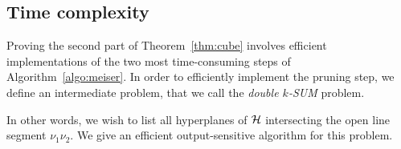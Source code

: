 \subsection{Time complexity}
\label{paper:ksum-algorithm:contrib:time-complexity}

Proving the second part of Theorem~\ref{thm:cube} involves efficient implementations of
the two most time-consuming steps of Algorithm~\ref{algo:meiser}.
In order to efficiently implement the pruning
step, we define an intermediate problem, that we call the \emph{double $k$-SUM}
problem.


In other words, we wish to list all hyperplanes of $\mathcal{H}$
intersecting the open line segment $\nu_1\nu_2$.
We give an efficient output-sensitive algorithm for this problem.


